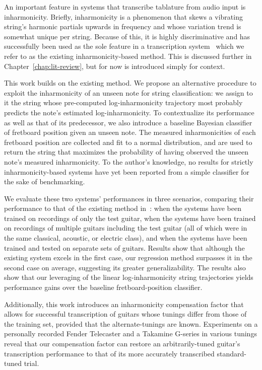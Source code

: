 \documentclass[12pt]{cmuthesis}
\begin{document}
An important feature in systems that transcribe tablature from audio input is inharmonicity. Briefly, inharmonicity is a phenomenon that skews a vibrating string's harmonic partials upwards in frequency and whose variation trend is somewhat unique per string. Because of this, it is highly discriminative and has successfully been used as the sole feature in a transcription system~\cite{barbanchoi2012} which we refer to as the existing inharmonicity-based method. This is discussed further in Chapter~\ref{chap:lit-review}, but for now is introduced simply for context.

This work builds on the existing method. We propose an alternative procedure to exploit the inharmonicity of an unseen note for string classification: we assign to it the string whose pre-computed log-inharmonicity trajectory most probably predicts the note's estimated log-inharmonicity. To contextualize its performance as well as that of its predecessor, we also introduce a baseline Bayesian classifier of fretboard position given an unseen note. The measured inharmonicities of each fretboard position are collected and fit to a normal distribution, and are used to return the string that maximizes the probability of having observed the unseen note's measured inharmonicity. To the author's knowledge, no results for strictly inharmonicity-based systems have yet been reported from a simple classifier for the sake of benchmarking. 

We evaluate these two systems' performances in three scenarios, comparing their performance to that of the existing method in~\cite{barbanchoi2012}: when the systems have been trained on recordings of only the test guitar, when the systems have been trained on recordings of multiple guitars including the test guitar (all of which were in the same classical, acoustic, or electric class), and when the systems have been trained and tested on separate sets of guitars. Results show that although the existing system excels in the first case, our regression method surpasses it in the second case on average, suggesting its greater generalizability. The results also show that our leveraging of the linear log-inharmonicity string trajectories yields performance gains over the baseline fretboard-position classifier.

Additionally, this work introduces an inharmonicity compensation factor that allows for successful transcription of guitars whose tunings differ from those of the training set, provided that the alternate-tunings are known. Experiments on a personally recorded Fender Telecaster and a Takamine G-series in various tunings reveal that our compensation factor can restore an arbitrarily-tuned guitar's transcription performance to that of its more accurately transcribed standard-tuned trial.
\end{document}
